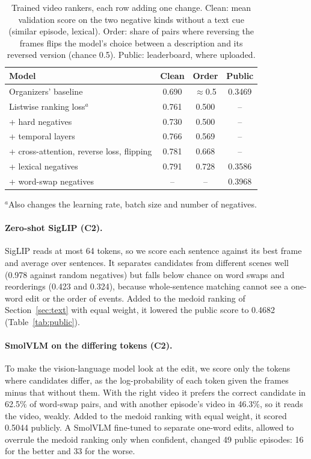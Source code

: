 \documentclass[10pt,twocolumn]{article}
\newcommand{\cha}[1]{\textsf{C#1}}
\begin{document}
\begin{table}[t]
\caption{Trained video rankers, each row adding one change. Clean: mean validation score on the two negative kinds
without a text cue (similar episode, lexical). Order: share of pairs where reversing the frames flips the model's
choice between a description and its reversed version (chance 0.5). Public: leaderboard, where uploaded.}
\label{tab:rankers}
\footnotesize
\setlength{\tabcolsep}{3pt}
\begin{tabularx}{\columnwidth}{>{\raggedright\arraybackslash}Xccc}
\toprule
Model & Clean & Order & Public \\
\midrule
Organizers' baseline & 0.690 & $\approx$0.5 & 0.3469 \\
Listwise ranking loss$^{a}$ & 0.761 & 0.500 & -- \\
+ hard negatives & 0.730 & 0.500 & -- \\
+ temporal layers & 0.766 & 0.569 & -- \\
+ cross-attention, reverse loss, flipping & 0.781 & 0.668 & -- \\
+ lexical negatives & 0.791 & 0.728 & 0.3586 \\
+ word-swap negatives & -- & -- & 0.3968 \\
\bottomrule
\end{tabularx}
\par\smallskip\footnotesize $^{a}$Also changes the learning rate, batch size and number of negatives.
\end{table}

\paragraph{Zero-shot SigLIP (\cha2).} SigLIP reads at most 64 tokens, so we score each sentence against its best
frame and average over sentences. It separates candidates from different scenes well (0.978 against random
negatives) but falls below chance on word swaps and reorderings (0.423 and 0.324), because whole-sentence matching
cannot see a one-word edit or the order of events. Added to the medoid ranking of Section~\ref{sec:text} with equal
weight, it lowered the public score to 0.4682 (Table~\ref{tab:public}).

\paragraph{SmolVLM on the differing tokens (\cha2).} To make the vision-language model look at the edit, we score
only the tokens where candidates differ, as the log-probability of each token given the frames minus that without
them. With the right video it prefers the correct candidate in 62.5\% of word-swap pairs, and with another
episode's video in 46.3\%, so it reads the video, weakly. Added to the medoid ranking with equal weight, it scored
0.5044 publicly. A SmolVLM fine-tuned to separate one-word edits, allowed to overrule the medoid ranking only when
confident, changed 49 public episodes: 16 for the better and 33 for the worse.
\end{document}
